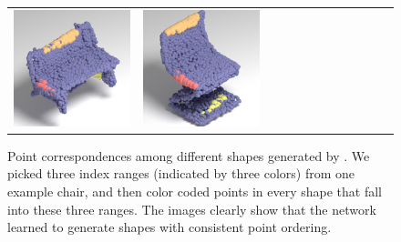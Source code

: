 \begin{figure}[t]
\begin{tabular}{cccccccccccc}
\includegraphics[width=.083\linewidth]{rendering/selected/corresp/m11.png} &
\includegraphics[width=.083\linewidth]{rendering/selected/corresp/m12.png} 
\end{tabular}
\vspace{-8pt}
    \caption{\small \label{fig:corresp} Point correspondences among different shapes generated by \mrvae. 
	We picked three index ranges (indicated by three colors) from one example chair, and then color coded points in every shape that fall into these three ranges. 
	The images clearly show that the network learned to generate shapes with consistent point ordering.
    }
    \vspace{-4pt}
\end{figure}

